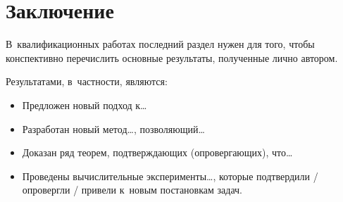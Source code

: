 \documentclass[12pt,a4paper,oneside,fleqn,leqno]{article}
\theoremstyle{definition}
\begin{document}



\section*{Заключение}

В~квалификационных работах последний раздел нужен для того, чтобы 
конспективно перечислить основные результаты, полученные лично автором. 

Результатами, в~частности, являются:
\begin{itemize}
\item 
    Предложен новый подход к\dots
\item 
    Разработан новый метод\dots, позволяющий\dots
\item 
    Доказан ряд теорем, подтверждающих (опровергающих), что\dots
\item 
    Проведены вычислительные эксперименты\dots,
    которые подтвердили / опровергли / привели к~новым постановкам задач.\cite{zhuravlev99pria-eng}
\end{itemize}
    

\end{document}
